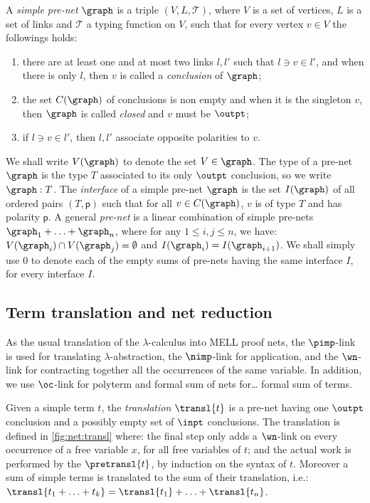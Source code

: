 \begin{definition} \label{def:prenet}
A \textit{simple pre-net} $\graph$ is a triple $(V, L, \mathcal{T})$,
where $V$ is a set of vertices, $L$ is a set of links and $\mathcal{T}$ a 
typing function on $V$, such that for every vertex $v \in V$ the followings 
holds:
\begin{enumerate}
\item
  there are at least one and at most two links $l, l'$ such that
  $l \ni v \in l'$, and when there is only $l$, then $v$ is called a 
  \textit{conclusion} of $\graph$;
\item 
  the set $C(\graph)$ of conclusions is non empty and when it is the singleton 
  $v$, then $\graph$ is called \textit{closed} and $v$ must be $\outpt$;
\item
  if $l \ni v \in l'$, then $l,l'$ associate opposite polarities to $v$.
\end{enumerate}
We shall write $V(\graph)$ to denote the set $V\in\graph$.
The type of a pre-net $\graph$ is the type $T$ associated to its only $\outpt$ 
conclusion, so we write $\graph:T$.
The \textit{interface} of a simple pre-net $\graph$ is the set $I(\graph)$ of 
all ordered pairs $(T,\mathsf{p})$ such that for all $v \in C (\graph)$, $v$ 
is of type $T$ and has polarity $\mathsf{p}$.
A general \textit{pre-net} is a linear combination of simple pre-nets
$\graph_1 + \ldots + \graph_n$, where for any $1 \leq i,j \leq n$, we have:
$V(\graph_i) \cap V(\graph_j)=\emptyset$ and 
$I(\graph_i)=I(\graph_{i+1})$.
We shall simply use $0$ to denote each of the empty sums of pre-nets having 
the same interface $I$, for every interface $I$.
\end{definition}

\subsection{Term translation and net reduction}
\label{sec:nets:transl}

As the usual translation of the $\lambda$-calculus into MELL proof nets, 
the $\pimp$-link is used for translating $\lambda$-abstraction, the 
$\nimp$-link for application, and the $\wn$-link for contracting together all 
the occurrences of the same variable.
In addition, we use $\oc$-link for polyterm and formal sum of nets for\ldots 
formal sum of terms.

\begin{definition}\label{def:RIN:transl}
Given a simple term $t$, the \textit{translation} $\transl{t}$ is a pre-net 
having one $\outpt$ conclusion and a possibly empty set of $\inpt$ conclusions.
The translation is defined in \autoref{fig:net:transl} where: the final step 
only adds a $\wn$-link on every occurrence of a free variable $x$, for all free 
variables of $t$; and the actual work is performed by the $\pretransl{t}$,
by induction on the syntax of $t$.
Moreover a sum of simple terms is translated to the sum of their translation, 
i.e.:
$\transl{t_1 + \ldots + t_k} = \transl{t_1}+\ldots+\transl{t_n}$.
\end{definition}

